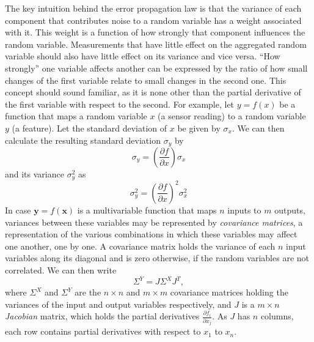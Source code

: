The key intuition behind the error propagation law is that the variance of each component that contributes noise to a random variable has a weight associated with it. This weight is a function of how strongly that component influences the random variable. Measurements that have little effect on the
aggregated random variable should also have little effect on its variance and vice versa. ``How strongly'' one variable affects another
can be expressed by the ratio of how small changes of the first variable relate to small changes in the second one. This concept should sound familiar, as it is none other 
than the partial derivative of the first variable with respect to the second. For example, let $y=f(x)$ be a function that maps a random variable $x$ (a sensor reading) to a random variable $y$ (a feature). Let the standard deviation of $x$ be given by $\sigma_x$. We can then calculate the resulting standard deviation $\sigma_y$ by
\begin{equation}
\sigma_y=\left(\frac{\partial f}{\partial x}\right) \sigma_x
\end{equation}
and its variance $\sigma_y^2$ as
\begin{equation}
\sigma_y^2=\left(\frac{\partial f}{\partial x}\right)^2 \sigma_x^2
\end{equation}
In case $\mathbf{y}=f(\mathbf{x})$ is a multivariable function that maps $n$ inputs to $m$ outputs, variances between these
variables may be represented by \textsl{covariance matrices}, a representation of the various combinations in
which these variables may affect one another, one by one. A covariance matrix holds the variance of each $n$ input variables along its diagonal and is zero otherwise, if the random variables are not correlated. We can then write
\begin{equation}
\Sigma^Y= J \Sigma^X J^T ,
\end{equation}
where $\Sigma^X$ and $\Sigma^Y$ are the $n \times n$ and $m \times m$ covariance matrices holding the variances of the input and output variables respectively, and
$J$ is a $m \times n$ \textsl{Jacobian} matrix, which holds the partial derivatives $\frac{\partial f_i}{\partial x_j}$. As $J$ has $n$ columns, each row contains partial derivatives with respect to $x_1$ to $x_n$.

